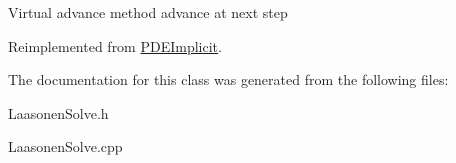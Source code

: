 Virtual advance method advance at next step 

Reimplemented from \hyperlink{class_p_d_e_implicit_a60980fe1e316329ab95ad179fce5a88b}{P\+D\+E\+Implicit}.



The documentation for this class was generated from the following files\+:\begin{DoxyCompactItemize}
\item 
Laasonen\+Solve.\+h\item 
Laasonen\+Solve.\+cpp\end{DoxyCompactItemize}

